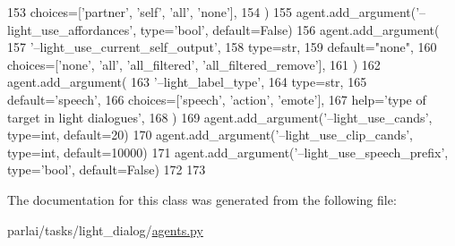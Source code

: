 \begin{DoxyCode}
153             choices=[\textcolor{stringliteral}{'partner'}, \textcolor{stringliteral}{'self'}, \textcolor{stringliteral}{'all'}, \textcolor{stringliteral}{'none'}],
154         )
155         agent.add\_argument(\textcolor{stringliteral}{'--light\_use\_affordances'}, type=\textcolor{stringliteral}{'bool'}, default=\textcolor{keyword}{False})
156         agent.add\_argument(
157             \textcolor{stringliteral}{'--light\_use\_current\_self\_output'},
158             type=str,
159             default=\textcolor{stringliteral}{"none"},
160             choices=[\textcolor{stringliteral}{'none'}, \textcolor{stringliteral}{'all'}, \textcolor{stringliteral}{'all\_filtered'}, \textcolor{stringliteral}{'all\_filtered\_remove'}],
161         )
162         agent.add\_argument(
163             \textcolor{stringliteral}{'--light\_label\_type'},
164             type=str,
165             default=\textcolor{stringliteral}{'speech'},
166             choices=[\textcolor{stringliteral}{'speech'}, \textcolor{stringliteral}{'action'}, \textcolor{stringliteral}{'emote'}],
167             help=\textcolor{stringliteral}{'type of target in light dialogues'},
168         )
169         agent.add\_argument(\textcolor{stringliteral}{'--light\_use\_cands'}, type=int, default=20)
170         agent.add\_argument(\textcolor{stringliteral}{'--light\_use\_clip\_cands'}, type=int, default=10000)
171         agent.add\_argument(\textcolor{stringliteral}{'--light\_use\_speech\_prefix'}, type=\textcolor{stringliteral}{'bool'}, default=\textcolor{keyword}{False})
172 
173 
\end{DoxyCode}


The documentation for this class was generated from the following file\+:\begin{DoxyCompactItemize}
\item 
parlai/tasks/light\+\_\+dialog/\hyperlink{parlai_2tasks_2light__dialog_2agents_8py}{agents.\+py}\end{DoxyCompactItemize}
